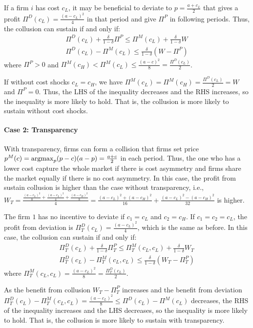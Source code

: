 \documentclass[12pt]{article}
\newcommand{\argmax}{\operatornamewithlimits{argmax}}
\begin{document}
If a firm $i$ has cost $c_L$, it may be beneficial to deviate to $p=\frac{a+c_L}{2}$ that gives a profit $\Pi^D(c_L)=\frac{(a-c_L)^2}{4}$ in that period and give $\Pi^P$ in following periods. Thus, the collusion can sustain if and only if:
\begin{equation}
    \begin{aligned}
        \Pi^D(c_L)+\frac{\delta}{1-\delta}\Pi^P\leq \Pi^M(c_L)+\frac{\delta}{1-\delta}W\\
        \Pi^D(c_L)-\Pi^M(c_L)\leq \frac{\delta}{1-\delta}(W-\Pi^P)
        \end{aligned}
        \nonumber
\end{equation}
where $\Pi^P>0$ and $\Pi^M(c_H)<\Pi^M(c_L)\leq\frac{(a-c)^2}{8}=\frac{\Pi^D(c_L)}{2}$.

If without cost shocks $c_L=c_H$, we have $\Pi^M(c_L)=\Pi^M(c_H)=\frac{\Pi^D(c_L)}{2}=W$ and $\Pi^P=0$. Thus, the LHS of the inequality decreases and the RHS increases, so the inequality is more likely to hold. That is, the collusion is more likely to sustain without cost shocks.

\paragraph{Case 2: Transparency}
With transparency, firms can form a collision that firms set price $p^M(c)=\argmax_p (p-c)(a-p)=\frac{a+c}{2}$ in each period. Thus, the one who has a lower cost capture the whole market if there is cost asymmetry and firms share the market equally if there is no cost asymmetry. In this case, the profit from sustain collusion is higher than the case without transparency, i.e., $W_T=\frac{\frac{(a-c_L)^2}{8}+\frac{(a-c_L)^2}{4}+\frac{(a-c_H)^2}{8}}{4}=\frac{(a-c_L)^2+(a-c_H)^2}{16}+\frac{(a-c_L)^2-(a-c_H)^2}{32}$ is higher.

The firm $1$ has no incentive to deviate if $c_1=c_L$ and $c_2=c_H$. If $c_1=c_2=c_L$, the profit from deviation is $\Pi^D_T(c_L)=\frac{(a-c_L)^2}{4}$, which is the same as before. In this case, the collusion can sustain if and only if:
\begin{equation}
    \begin{aligned}
        \Pi^D_T(c_L)+\frac{\delta}{1-\delta}\Pi^P_T\leq \Pi^M_T(c_L,c_L)+\frac{\delta}{1-\delta}W_T\\
        \Pi^D_T(c_L)-\Pi^M_T(c_L,c_L)\leq \frac{\delta}{1-\delta}(W_T-\Pi^P_T)
    \end{aligned}
    \nonumber
\end{equation}
where $\Pi^M_T(c_L,c_L)=\frac{(a-c_L)^2}{8}=\frac{\Pi^D_T(c_L)}{2}$.

As the benefit from collusion $W_T-\Pi^P_T$ increases and the benefit from deviation $\Pi^D_T(c_L)-\Pi^M_T(c_L,c_L)=\frac{(a-c_L)^2}{8}\leq\Pi^D(c_L)-\Pi^M(c_L)$ decreases, the RHS of the inequality increases and the LHS decreases, so the inequality is more likely to hold. That is, the collusion is more likely to sustain with transparency.
\end{document}
